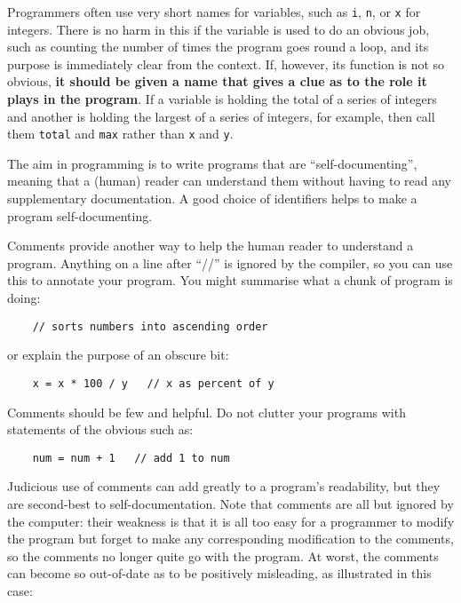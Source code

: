 Programmers often use very short names for variables, such as
\verb!i!, \verb!n!, or 
\verb!x! for integers.  There is no harm in this if the variable is used to
do an obvious job, such as counting the number of times the program goes round
a loop, and its purpose is immediately clear from the context.  If, however, its
function is not so obvious, \textbf{it should be given a name that
gives a clue as to the role it plays in the program}.  If a variable is
holding the total of a series of integers and another is holding the
largest of a series of integers, for example, then call them \verb!total!
and \verb!max! rather than \verb!x! and \verb!y!.

The aim in programming is to write programs that are ``self-documenting'',
meaning that a (human) reader can understand them without having to read
any supplementary documentation.  A good choice of identifiers helps to
make a program self-documenting.

Comments provide another way to help the human reader to understand a
program.  Anything on a line after ``//'' is ignored by the compiler,
so you can use this to annotate your program.  You might summarise
what a chunk of program is doing:

\begin{Verbatim}
    // sorts numbers into ascending order
\end{Verbatim}

or explain the purpose of an obscure bit:

\begin{Verbatim}
    x = x * 100 / y   // x as percent of y
\end{Verbatim}

Comments should be few and helpful.  Do not clutter your programs with
statements of the obvious such as:

\begin{Verbatim}
    num = num + 1   // add 1 to num
\end{Verbatim}

Judicious use of comments can add greatly to a program's readability, but they
are second-best to self-documentation. Note that comments are all but
ignored by the computer: their weakness is that it is all too
easy for a programmer to modify the program but forget to make any
corresponding modification to the comments, so the comments no longer quite
go with the program. At worst, the comments can become so out-of-date as
to be positively misleading, as illustrated in this case: 

